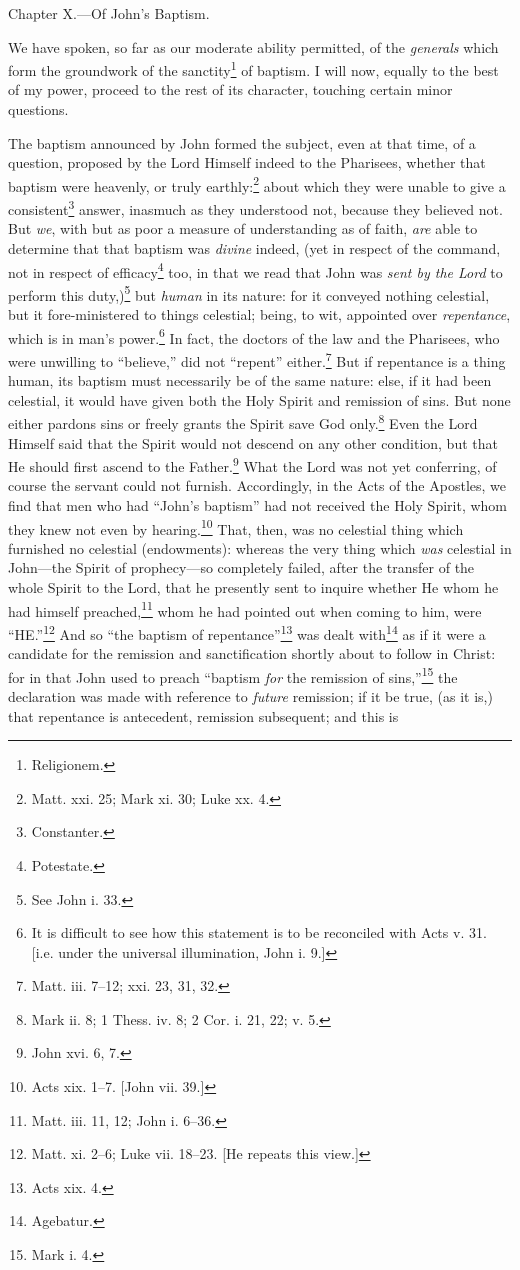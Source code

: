 
Chapter X.—Of John’s Baptism.

We have spoken, so far as our moderate ability permitted, of the \emph{generals} which form the groundwork of the sanctity\footnote{Religionem.} of baptism. I will now, equally to the best of my power, proceed to the rest of its character, touching certain minor questions.

The baptism announced by John formed the subject, even at that time, of a question, proposed by the Lord Himself indeed to the Pharisees, whether that baptism were heavenly, or truly earthly:\footnote{Matt. xxi. 25; Mark xi. 30; Luke xx. 4.} about which they were unable to give a consistent\footnote{Constanter.} answer, inasmuch as they understood not, because they believed not. But \emph{we}, with but as poor a measure of understanding as of faith, \emph{are} able to determine that that baptism was \emph{divine} indeed, (yet in respect of the command, not in respect of efficacy\footnote{Potestate.} too, in that we read that John was \emph{sent by the Lord} to perform this duty,)\footnote{See John i. 33.} but \emph{human} in its nature: for it conveyed nothing celestial, but it fore-ministered to things celestial; being, to wit, appointed over \emph{repentance}, which is in man’s power.\footnote{It is difficult to see how this statement is to be reconciled with Acts v. 31. [i.e. under the universal illumination, John i. 9.]} In fact, the doctors of the law and the Pharisees, who were unwilling to “believe,” did not “repent” either.\footnote{Matt. iii. 7–12; xxi. 23, 31, 32.} But if repentance is a thing human, its baptism must necessarily be of the same nature: else, if it had been celestial, it would have given both the Holy Spirit and remission of sins. But none either pardons sins or freely grants the Spirit save God only.\footnote{Mark ii. 8; 1 Thess. iv. 8; 2 Cor. i. 21, 22; v. 5.} Even the Lord Himself said that the Spirit would not descend on any other condition, but that He should first ascend to the Father.\footnote{John xvi. 6, 7.} What the Lord was not yet conferring, of course the servant could not furnish. Accordingly, in the Acts of the Apostles, we find that men who had “John’s baptism” had not received the Holy Spirit, whom they knew not even by hearing.\footnote{Acts xix. 1–7. [John vii. 39.]} That, then, was no celestial thing which furnished no celestial (endowments): whereas the very thing which \emph{was} celestial in John—the Spirit of prophecy—so completely failed, after the transfer of the whole Spirit to the Lord, that he presently sent to inquire whether He whom he had himself preached,\footnote{Matt. iii. 11, 12; John i. 6–36.} whom he had pointed out when coming to him, were “HE.”\footnote{Matt. xi. 2–6; Luke vii. 18–23. [He repeats this view.]} And so “the baptism of repentance”\footnote{Acts xix. 4.} was dealt with\footnote{Agebatur.} as if it were a candidate for the remission and sanctification shortly about to follow in Christ: for in that John used to preach “baptism \emph{for} the remission of sins,”\footnote{Mark i. 4.} the declaration was made with reference to \emph{future} remission; if it be true, (as it is,) that repentance is antecedent, remission subsequent; and this is 